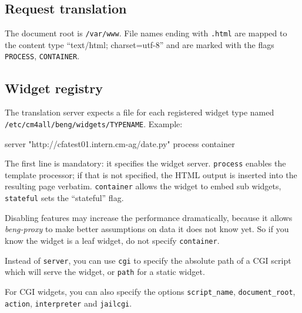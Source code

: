 \documentclass[a4paper,12pt]{article}
\begin{document}
\subsection{Request translation}

The document root is \texttt{/var/www}.  File names ending with
\texttt{.html} are mapped to the content type ``text/html;
charset=utf-8'' and are marked with the flags \verb|PROCESS|,
\verb|CONTAINER|.

\subsection{Widget registry}

The translation server expects a file for each registered widget type
named \texttt{/etc/cm4all/beng/widgets/TYPENAME}.  Example:

\begin{verbatim*}
server "http://cfatest01.intern.cm-ag/date.py"
process
container
\end{verbatim*}

The first line is mandatory: it specifies the widget server.
\texttt{process} enables the template processor; if that is not
specified, the HTML output is inserted into the resulting page
verbatim.  \texttt{container} allows the widget to embed sub widgets,
\texttt{stateful} sets the ``stateful'' flag.

Disabling features may increase the performance dramatically, because
it allows \emph{beng-proxy} to make better assumptions on data it does
not know yet.  So if you know the widget is a leaf widget, do not
specify \texttt{container}.

Instead of \texttt{server}, you can use \texttt{cgi} to specify the
absolute path of a CGI script which will serve the widget, or
\texttt{path} for a static widget.

For CGI widgets, you can also specify the options
\texttt{script\_name}, \texttt{docu\-ment\_root}, \texttt{action},
\texttt{interpreter} and \texttt{jailcgi}.
\end{document}
